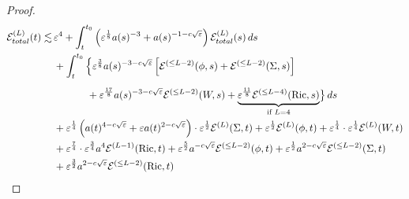 \documentclass[11pt,leqno,textwidth=10cm]{amsart}
\numberwithin{equation}{section}
\theoremstyle{definition}
\theoremstyle{plain}
\newcommand{\1}{\mathbbm{1}}
\newcommand{\E}{\mathcal{E}}
\newcommand{\Ric}{\text{\normalfont{Ric}}}
\renewcommand{\epsilon}{\varepsilon}
\newcommand{\Lap}{\Delta}
\begin{document}
{\begin{proof}
\begin{subequations}
\begin{align}
\E_{total}^{(L)}(t)\lesssim&\,\epsilon^4+\int_t^{t_0}\left(\epsilon^\frac18a(s)^{-3}+a(s)^{-1-c\sqrt{\epsilon}}\right)\E_{total}^{(L)}(s)\label{eq:en-est-top-total1}\,ds\\
&\,+\int_t^{t_0}\left\{\epsilon^\frac38a(s)^{-3-c\sqrt{\epsilon}}\left[\E^{(\leq L-2)}(\phi,s)+\E^{(\leq L-2)}(\Sigma,s)\right]\right.\label{eq:en-est-top-total2}\\
&\,\phantom{+\int_t^{t_0}\bigr\{}%
+\epsilon^\frac{17}8a(s)^{-3-c\sqrt{\epsilon}}\E^{(\leq L-2)}(W,s)+\underbrace{\epsilon^\frac{11}8\E^{(\leq L-4)}(\Ric,s)}_{\text{if }L=4}\bigr\}\,ds
\label{eq:en-est-top-total4}\\
&\,+\epsilon^\frac14\left(a(t)^{4-c\sqrt{\epsilon}}+\epsilon a(t)^{2-c\sqrt{\epsilon}}\right)\cdot \epsilon^\frac12\E^{(L)}(\Sigma,t)+\epsilon^\frac12\E^{(L)}(\phi,t)+\epsilon^\frac14\cdot \epsilon^\frac14\E^{(L)}(W,t)\label{eq:en-est-top-total5}\\
&\,+\epsilon^\frac74\cdot \epsilon^\frac34a^4\E^{(L-1)}(\Ric,t)+\epsilon^\frac52 a^{-c\sqrt{\epsilon}}\E^{(\leq L-2)}(\phi,t)+\epsilon^\frac12 a^{2-c\sqrt{\epsilon}}\E^{(\leq L-2)}(\Sigma,t)\label{eq:en-est-top-total6}\\
&\,+\epsilon^\frac32 a^{2-c\sqrt{\epsilon}}\E^{(\leq L-2)}(\Ric,t)\label{eq:en-est-top-total7}
\end{align}
\end{subequations}



\end{proof}}
\end{document}
